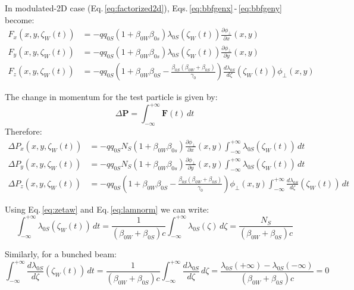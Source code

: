 In modulated-2D case (Eq.\,\ref{eq:factorized2d}), Eqs.\,\eqref{eq:bbfgenx}\,-\,\eqref{eq:bbfgeny} become:
\begin{align}
F_x(x, y, \zeta_W(t)) &=  -q q_{0S} (1+\beta_{0W}  \beta_{0s})
\lambda_{0S}(\zeta_W(t))
 \frac{\partial \phi_\perp}{\partial x}(x, y ) \\
F_y(x, y, \zeta_W(t)) &=  -qq_{0S}  (1+\beta_{0W}  \beta_{0s})
\lambda_{0S}(\zeta_W(t))
 \frac{\partial \phi_\perp}{\partial y}(x, y ) \\
F_z(x, y, \zeta_W(t)) &=  -qq_{0S}\left(1+\beta_{0W}  \beta_{0S} -\frac{\beta_{0S}(\beta_{0W}+\beta_{0S})}{\gamma_0}\right) \frac{d \lambda_{0S}}{d \zeta}(\zeta_W(t)) \phi_\perp(x, y)
\end{align}

The change in momentum for the test particle is given by:
\begin{equation}
\Delta \textbf{P} = \int_{-\infty}^{+\infty} \textbf{F}(t) \,dt
\end{equation}
Therefore:
\begin{align}
\Delta P_x(x, y, \zeta_W(t)) &=  -qq_{0S} N_S (1+\beta_{0W}  \beta_{0s})
\frac{\partial \phi_\perp}{\partial x}(x, y ) \int_{-\infty}^{+\infty}\lambda_{0S}(\zeta_W(t)) \,dt\\
\Delta P_y(x, y, \zeta_W(t)) &=  -qq_{0S} N_S (1+\beta_{0W}  \beta_{0s})
 \frac{\partial \phi_\perp}{\partial y}(x, y ) \int_{-\infty}^{+\infty}\lambda_{0S}(\zeta_W(t)) \,dt\\
\Delta P_z(x, y, \zeta_W(t)) &=  -qq_{0S}\left(1+\beta_{0W}  \beta_{0S} -\frac{\beta_{0S}(\beta_{0W}+\beta_{0S})}{\gamma_0}\right) \phi_\perp(x, y) \int_{-\infty}^{+\infty}\frac{d \lambda_{0S}}{d \zeta}(\zeta_W(t)) \, dt
\end{align}

Using Eq.\,\eqref{eq:zetaw} and Eq.\,\eqref{eq:lamnorm} we can write:
\begin{equation}
\int_{-\infty}^{+\infty}\lambda_{0S}(\zeta_W(t)) \,dt 
=\frac{1}{(\beta_{0W}+\beta_{0S})c}\int_{-\infty}^{+\infty}\lambda_{0S}(\zeta) \,d\zeta = \frac{N_S}{(\beta_{0W}+\beta_{0S})c}
\end{equation}

Similarly, for a bunched beam:
\begin{equation}
\int_{-\infty}^{+\infty}
\frac{d \lambda_{0S}}{d \zeta}(\zeta_W(t)) \,dt 
=\frac{1}{(\beta_{0W}+\beta_{0S})c}\int_{-\infty}^{+\infty}\frac{d \lambda_{0S}}{d \zeta} \,d\zeta = \frac{ \lambda_{0S}(+\infty)-\lambda_{0S}(-\infty)}{(\beta_{0W}+\beta_{0S})c} = 0
\end{equation}

